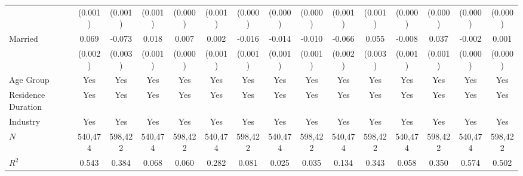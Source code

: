 \documentclass[serif, aspectratio=169]{beamer}
\begin{document}
\begin{frame}
\begin{table}[htbp]
{\begin{tabular}{@{}l*{14}{c}@{}}
          &  (0.001)         &  (0.001)         &  (0.001)         &  (0.000)         &  (0.001)         &  (0.000)         &  (0.000)         &  (0.000)         &  (0.001)         &  (0.001)         &  (0.000)         &  (0.000)         &  (0.000)         &  (0.000)         \\
\addlinespace
Married   &    0.069\sym{***}&   -0.073\sym{***}&    0.018\sym{***}&    0.007\sym{***}&    0.002\sym{*}  &   -0.016\sym{***}&   -0.014\sym{***}&   -0.010\sym{***}&   -0.066\sym{***}&    0.055\sym{***}&   -0.008\sym{***}&    0.037\sym{***}&   -0.002\sym{***}&    0.001\sym{***}\\
          &  (0.002)         &  (0.003)         &  (0.001)         &  (0.000)         &  (0.001)         &  (0.001)         &  (0.001)         &  (0.001)         &  (0.002)         &  (0.003)         &  (0.001)         &  (0.001)         &  (0.000)         &  (0.000)         \\
\addlinespace
Age Group &      Yes         &      Yes         &      Yes         &      Yes         &      Yes         &      Yes         &      Yes         &      Yes         &      Yes         &      Yes         &      Yes         &      Yes         &      Yes         &      Yes         \\
\addlinespace
Residence Duration &      Yes         &      Yes         &      Yes         &      Yes         &      Yes         &      Yes         &      Yes         &      Yes         &      Yes         &      Yes         &      Yes         &      Yes         &      Yes         &      Yes         \\
\addlinespace
Industry  &      Yes         &      Yes         &      Yes         &      Yes         &      Yes         &      Yes         &      Yes         &      Yes         &      Yes         &      Yes         &      Yes         &      Yes         &      Yes         &      Yes         \\
\midrule
$\textit{N}$&  540,474         &  598,422         &  540,474         &  598,422         &  540,474         &  598,422         &  540,474         &  598,422         &  540,474         &  598,422         &  540,474         &  598,422         &  540,474         &  598,422         \\
$\textit{R}^2$&    0.543         &    0.384         &    0.068         &    0.060         &    0.282         &    0.081         &    0.025         &    0.035         &    0.134         &    0.343         &    0.058         &    0.350         &    0.574         &    0.502         \\

\end{tabular}}
\end{table}
\end{frame}
\end{document}
